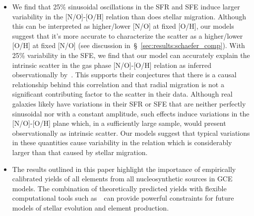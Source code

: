 \documentclass[ms.tex]{subfiles}
\begin{document}
\begin{itemize}
	\item We find that 25\% sinusoidal oscillations in the SFR and SFE induce 
	larger variability in the [N/O]-[O/H] relation than does stellar migration. 
	Although this can be interpreted as higher/lower [N/O] at fixed [O/H], our 
	models suggest that it's more accurate to characterize the scatter as a 
	higher/lower [O/H] at fixed [N/O] (see discussion 
	in~\S~\ref{sec:results:schaefer_comp}). 
	With 25\% variability in the SFE, we find that our model can accurately 
	explain the intrinsic scatter in the gas phase [N/O]-[O/H] relation as 
	inferred observationally by~\citet{Schaefer2020}. 
	This supports their conjectures that there is a causal relationship behind 
	this correlation and that radial migration is not a significant 
	contributing factor to the scatter in their data. 
	Although real galaxies likely have variations in their SFR or SFE that are 
	neither perfectly sinusoidal nor with a constant amplitude, such effects 
	induce variations in the [N/O]-[O/H] plane which, in a sufficiently large 
	sample, would present observationally as intrinsic scatter.  
	Our models suggest that typical variations in these 
	quantities cause variability in the relation which is considerably larger 
	than that caused by stellar migration. 

	\item The results outlined in this paper highlight the importance of 
	empirically calibrated yields of all elements from all nucleosynthetic 
	sources in GCE models. 
	The combination of theoretically predicted yields with flexible 
	computational tools such as~\vice~can provide powerful constraints for 
	future models of stellar evolution and element production. 
\end{itemize} 
\end{document}
